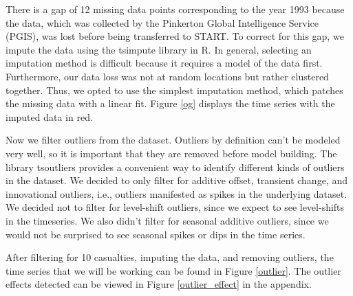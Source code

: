 \documentclass[11pt]{paper}
\begin{document}

There is a gap of 12 missing data points corresponding to the year 1993 because the data, which was collected by the Pinkerton Global Intelligence Service (PGIS), was lost before being transferred to START. To correct for this gap, we impute the data using the tsimpute library in R. In general, selecting an imputation method is difficult because it requires a model of the data first. Furthermore, our data loss was not at random locations but rather clustered together. Thus, we opted to use the simplest imputation method, which patches the missing data with a linear fit. Figure \ref{og} displays the time series with the imputed data in red.


Now we filter outliers from the dataset. Outliers by definition can't be modeled very well, so it is important that they are removed before model building. The library tsoutliers provides a convenient way to identify different kinds of outliers in the dataset. We decided to only filter for additive offset, transient change, and innovational outliers, i.e., outliers manifested as spikes in the underlying dataset. We decided not to filter for level-shift outliers, since we expect to see level-shifts in the timeseries. We also didn’t filter for seasonal additive outliers, since we would not be surprised to see seasonal spikes or dips in the time series.

After filtering for 10 casualties, imputing the data, and removing outliers, the time series that we will be working can be found in Figure \ref{outlier}. The outlier effects detected can be viewed in Figure \ref{outlier_effect} in the appendix.
\end{document}

